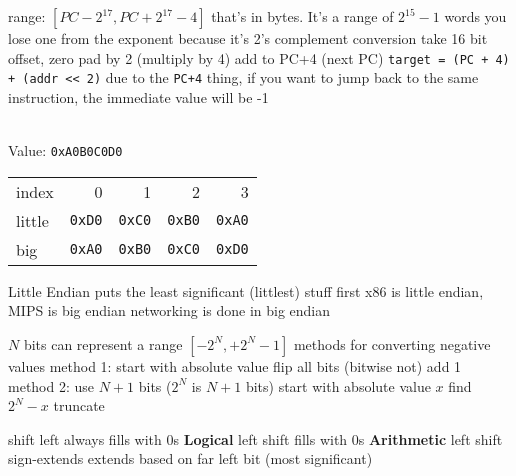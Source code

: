 \documentclass[12pt]{article}
\begin{document}
\begin{spacing}{0.9}
\begin{multicols*}{2}
\begin{flushleft}
\begin{outline}[longenum]
  \1 range: $[ PC - 2^{17}, PC + 2^{17} - 4 ]$
    \2 that's in bytes. It's a range of $2^{15}-1$ words
    \2 you lose one from the exponent because it's 2's complement
  \1 conversion
    \2 take 16 bit offset, zero pad by 2 (multiply by 4)
    \2 add to PC+4 (next PC)
  \1 \verb|target = (PC + 4) + (addr << 2)|
  \1 due to the \verb|PC+4| thing, if you want to jump back to the same instruction, the immediate value will be -1

\\
Value: \verb|0xA0B0C0D0|\\
  \1 
  \begin{tabular}{l r r r r}
  index  & 0 & 1 & 2 & 3 \\
  little & \verb|0xD0| & \verb|0xC0| & \verb|0xB0| & \verb|0xA0| \\
  big    & \verb|0xA0| & \verb|0xB0| & \verb|0xC0| & \verb|0xD0| \\
  \end{tabular}
    \2 Little Endian puts the least significant (littlest) stuff first
  \1 x86 is little endian, MIPS is big endian
  \1 networking is done in big endian

  \1 $N$ bits can represent a range $[ -2^N, +2^N - 1 ]$
  \1 methods for converting negative values
  \1 method 1:
    \2 start with absolute value
    \2 flip all bits (bitwise not)
    \2 add 1
  \1 method 2:
    \2 use $N+1$ bits ($2^N$ is $N+1$ bits)
    \2 start with absolute value $x$
    \2 find $2^N - x$
    \2 truncate

  \1 shift left always fills with 0s
  \1 \textbf{Logical} left shift fills with 0s
  \1 \textbf{Arithmetic} left shift sign-extends
    \2 extends based on far left bit (most significant)
 

\end{outline}
\end{flushleft}
\end{multicols*}
\end{spacing}
\end{document}
